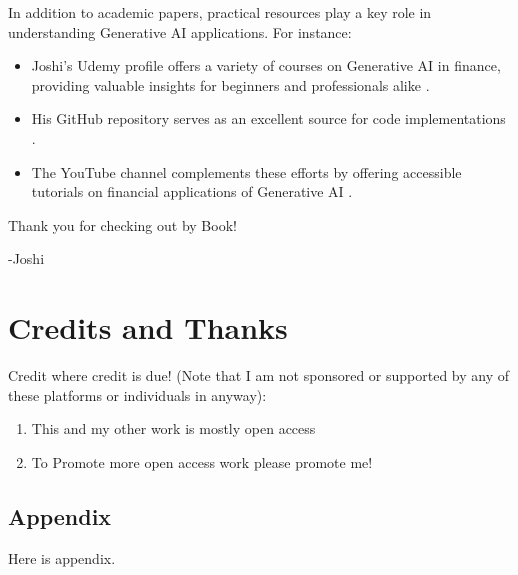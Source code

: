 \documentclass[a4paper,12pt]{scrbook}
\begin{document}
	
	In addition to academic papers, practical resources play a key role in understanding Generative AI applications. For instance:
	\begin{itemize}
		\item Joshi’s Udemy profile offers a variety of courses on Generative AI in finance, providing valuable insights for beginners and professionals alike \cite{JoshiUdemy2025}.
		\item His GitHub repository serves as an excellent source for code implementations \cite{JoshiGit2025}.
		\item The YouTube channel complements these efforts by offering accessible tutorials on financial applications of Generative AI \cite{JoshiYouTube2025}.
	\end{itemize}
	
	
	
	Thank you for checking out by Book!
	

	
	-Joshi
	
	\chapter*{Credits and Thanks}
	
	Credit where credit is due! (Note that I am not sponsored or supported by any of these platforms or individuals in anyway):
	
	\begin{enumerate}
		\item This and my other work is mostly open access
		\item To Promote more open access work please promote me!
		
	\end{enumerate}
	
	\begin{appendices}
		
		\chapter*{Appendix }
		
		Here is appendix.
		
		
		
	\end{appendices}
	
	\printindex
	
\end{document}
